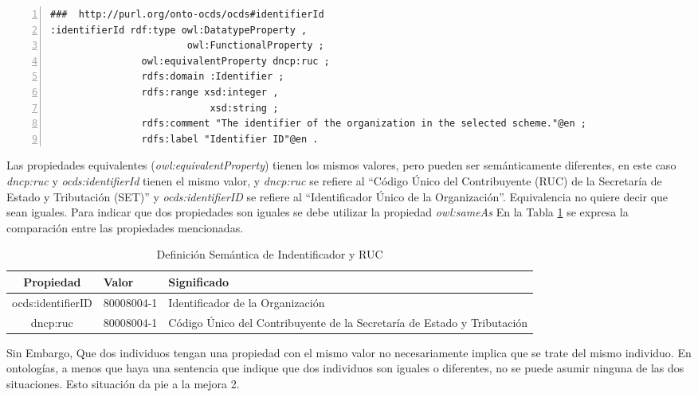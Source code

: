 \noindent\begin{minipage}{\textwidth}
 \begin{lstlisting}[captionpos=b, caption={Declaración de equivalencia semántica entre dncp:ruc y ocds:identifierID}, label=lst:caso2-2,  numbers=left,  numberstyle=\tiny\color{mygray},frame=single]
###  http://purl.org/onto-ocds/ocds#identifierId
:identifierId rdf:type owl:DatatypeProperty ,
                        owl:FunctionalProperty ;
                owl:equivalentProperty dncp:ruc ;
                rdfs:domain :Identifier ;
                rdfs:range xsd:integer ,
                            xsd:string ;
                rdfs:comment "The identifier of the organization in the selected scheme."@en ;
                rdfs:label "Identifier ID"@en .
 \end{lstlisting}
\end{minipage}

 Las propiedades equivalentes (\textit{owl:equivalentProperty}) tienen los mismos valores, pero pueden ser semánticamente diferentes, en este caso \textit{dncp:ruc} y \textit{ocds:identifierId} tienen el mismo valor, y \textit{dncp:ruc} se refiere al “Código Único del Contribuyente (RUC) de la Secretaría de Estado y Tributación (SET)” y \textit{ocds:identifierID} se refiere al “Identificador Único de la Organización”. Equivalencia no quiere decir que sean iguales. Para indicar que dos propiedades son iguales se debe utilizar la propiedad \textit{owl:sameAs}
 En la Tabla \ref{table:semanticaID} se expresa la comparación entre las propiedades mencionadas.

 \begin{table}[!htb]
    \centering
    \caption{Definición Semántica de Indentificador y RUC}
    \label{table:semanticaID}
    \resizebox{15cm}{!} {
    \begin{tabular}{|c|l|l|}
    \hline
    
Propiedad & Valor &  Significado \\ \hline

ocds:identifierID  & 80008004-1 &  Identificador de la Organización \\ \hline
dncp:ruc & 80008004-1 &  Código Único del Contribuyente de la Secretaría de Estado y Tributación \\ \hline

    \end{tabular}
    }
    \end{table}
    
 Sin Embargo, Que dos individuos tengan una propiedad con el mismo valor no necesariamente implica que se trate del mismo individuo. En ontologías, a menos que haya una sentencia que indique que dos individuos son iguales o diferentes, no se puede asumir ninguna de las dos situaciones. Esto situación da pie a la mejora 2.

